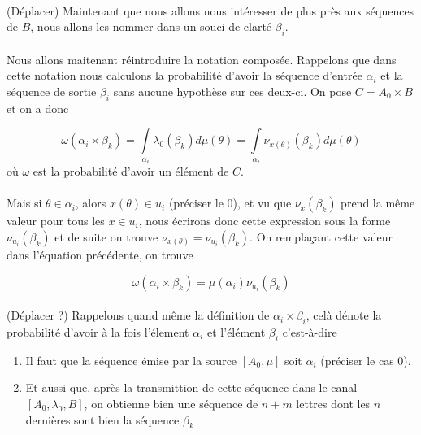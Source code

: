 	\paragraph{}
	(Déplacer) Maintenant que nous allons nous intéresser de plus près aux séquences de $B$, nous allons les nommer dans un souci
	de clarté $\beta_i$.
	
	\paragraph{}
	Nous allons maitenant réintroduire la notation composée. Rappelons que dans cette notation nous calculons la probabilité d'avoir la séquence
	d'entrée $\alpha_i$ et la séquence de sortie $\beta_i$ sans aucune hypothèse sur ces deux-ci. On pose $C = A_0 \times B$ et on a donc
	
	
	\[\omega(\alpha_i\times\beta_k)=\int\limits_{\alpha_i}\lambda_0(\beta_k)d\mu(\theta)=\int\limits_{\alpha_i}\nu_{x(\theta)}(\beta_k)d\mu(\theta)\]
	où $\omega$ est la probabilité d'avoir un élément de $C$.
	
	\paragraph{}
	Mais si $\theta \in \alpha_i$, alors $x(\theta) \in u_i$ (préciser le 0), et vu que $\nu_x(\beta_k)$ prend la même valeur
	pour tous les $x \in u_i$, nous écrirons donc cette expression sous la forme $\nu_{u_i}(\beta_k)$ et de suite on trouve $\nu_{x(\theta)}=\nu_{u_i}(\beta_k)$.
	On remplaçant cette valeur dans l'équation précédente, on trouve
	
	\[\omega(\alpha_i\times\beta_k)=\mu(\alpha_i)\nu_{u_i}(\beta_k)\]
	
	\paragraph{} (Déplacer ?)
	Rappelons quand même la définition de $\alpha_i \times \beta_i$, celà dénote la probabilité d'avoir à la fois l'élement $\alpha_i$ et l'élément $\beta_i$ c'est-à-dire
	\begin{enumerate}
		\item Il faut que la séquence émise par la source $[A_0,\mu]$ soit $\alpha_i$ (préciser le cas 0).
		\item Et aussi que, après la transmittion de cette séquence dans le canal $[A_0,\lambda_0,B]$, on obtienne bien une séquence de $n+m$ lettres dont les $n$ 
		dernières sont bien la séquence $\beta_k$
	\end{enumerate} 
	
